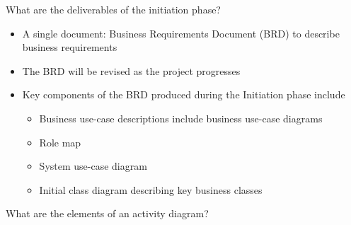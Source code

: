 \documentclass[10pt,a4paper,answers]{exam}
\begin{document}
\begin{questions}
\question What are the deliverables of the initiation phase?
\begin{solution}
\begin{itemize}

        \item A single document: Business Requirements Document (BRD) to describe business requirements
        \item The BRD will be revised as the project progresses
        \item Key components of the BRD produced during the Initiation phase include

        \begin{itemize}
        \item Business use-case descriptions include business use-case diagrams
        \item Role map
        \item System use-case diagram
        \item Initial class diagram describing key business classes
        \end{itemize}

\end{itemize}
\end{solution}


\question What are the elements of an activity diagram?
\begin{solution}
\begin{itemize}


\end{itemize}
\end{solution}
\end{questions}
\end{document}
